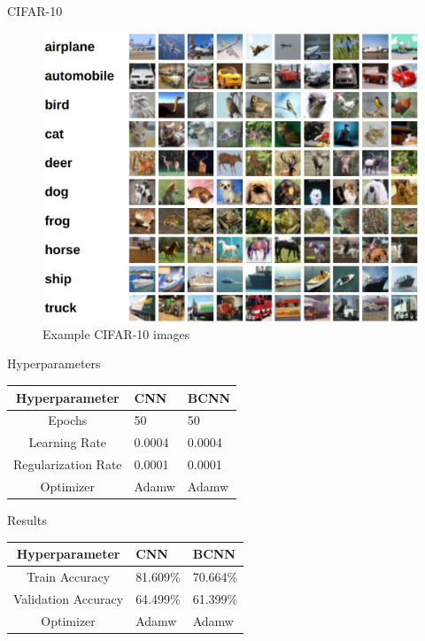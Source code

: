 \documentclass{beamer}
\begin{document}
\begin{frame}{CIFAR-10}
	\begin{figure}
		\includegraphics[width=.65\textwidth]{../Images/cifar-10.png}
		\caption{Example CIFAR-10 images \cite{cifar10}}
	\end{figure}
\end{frame}

\begin{frame}{Hyperparameters}
	\centering
	\begin{tabular}{|c||p{3cm}|p{3cm}|} %
		\hline
		\textbf{Hyperparameter} & \textbf{CNN} & \textbf{BCNN} \\ [0.5ex] 
		\hline\hline
		Epochs & 50 & 50\\
		\hline
		Learning Rate & 0.0004  & 0.0004  \\
		\hline
		Regularization Rate& 0.0001 & 0.0001 \\
		\hline
		Optimizer & Adamw  & Adamw  \\
		\hline
	\end{tabular}
\end{frame}

\begin{frame}{Results}
	\centering
	\begin{tabular}{|c||p{3cm}|p{3cm}|} %
		\hline
		\textbf{Hyperparameter} & \textbf{CNN} & \textbf{BCNN} \\ [0.5ex] 
		\hline\hline
		Train Accuracy & 81.609\% & 70.664\%\\
		\hline
		Validation Accuracy & 64.499\%  & 61.399\%  \\
		\hline
		Optimizer & Adamw  & Adamw  \\
		\hline
	\end{tabular}
\end{frame}
\end{document}
